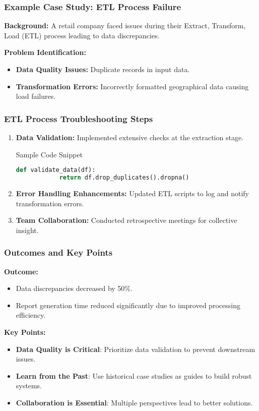 \documentclass[aspectratio=169]{beamer}
\begin{document}
\begin{frame}[fragile]
  \frametitle{Example Case Study: ETL Process Failure}
  \textbf{Background:} A retail company faced issues during their Extract, Transform, Load (ETL) process leading to data discrepancies.

  \textbf{Problem Identification:}
  \begin{itemize}
    \item \textbf{Data Quality Issues:} Duplicate records in input data.
    \item \textbf{Transformation Errors:} Incorrectly formatted geographical data causing load failures.
  \end{itemize}
\end{frame}

\begin{frame}[fragile]
  \frametitle{ETL Process Troubleshooting Steps}
  \begin{enumerate}
    \item \textbf{Data Validation:} Implemented extensive checks at the extraction stage.
      \begin{block}{Sample Code Snippet}
      \begin{lstlisting}[language=Python]
        def validate_data(df):
            return df.drop_duplicates().dropna()
      \end{lstlisting}
      \end{block}
    \item \textbf{Error Handling Enhancements:} Updated ETL scripts to log and notify transformation errors.
    \item \textbf{Team Collaboration:} Conducted retrospective meetings for collective insight.
  \end{enumerate}
\end{frame}

\begin{frame}[fragile]
  \frametitle{Outcomes and Key Points}
  \textbf{Outcome:}
  \begin{itemize}
    \item Data discrepancies decreased by 50\%.
    \item Report generation time reduced significantly due to improved processing efficiency.
  \end{itemize}

  \textbf{Key Points:}
  \begin{itemize}
    \item \textbf{Data Quality is Critical}: Prioritize data validation to prevent downstream issues.
    \item \textbf{Learn from the Past}: Use historical case studies as guides to build robust systems.
    \item \textbf{Collaboration is Essential}: Multiple perspectives lead to better solutions.
  \end{itemize}
\end{frame}
\end{document}

